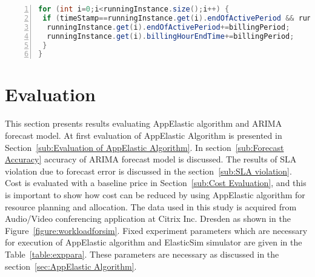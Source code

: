 \begin{lstlisting}[language=java,caption=AppElastic No scale/extend VM,label=list:appelasticnoscale,numbers=left,frame=single,fontadjust=true,breaklines,basicstyle=\small]
for (int i=0;i<runningInstance.size();i++) {
 if (timeStamp==runningInstance.get(i).endOfActivePeriod && runningInstance.get(i).canExtend) {
  runningInstance.get(i).endOfActivePeriod+=billingPeriod;
  runningInstance.get(i).billingHourEndTime+=billingPeriod;
 }
}
\end{lstlisting}

\section{Evaluation}
\label{sec:Evaluation}
This section presents results evaluating AppElastic algorithm and ARIMA forecast model. At first evaluation of AppElastic Algorithm is presented in Section~\ref{sub:Evaluation of AppElastic Algorithm}. In section~\ref{sub:Forecast Accuracy} accuracy of ARIMA forecast model is discussed. The results of SLA violation due to forecast error is discussed in the section~\ref{sub:SLA violation}. Cost is evaluated with a baseline price in Section~\ref{sub:Cost Evaluation}, and this is important to show how cost can be reduced by using AppElastic algorithm for resource planning and allocation. The data used in this study is acquired from Audio/Video conferencing application at Citrix Inc. Dresden as shown in the Figure~\ref{figure:workloadforsim}. Fixed experiment parameters which are necessary for execution of AppElastic algorithm and ElasticSim simulator are given in the Table~\ref{table:exppara}. These parameters are necessary as discussed in the section~\ref{sec:AppElastic Algorithm}.
\begin{center}
  \begin{table}
    \caption{ Fixed experiment parameters}
     \label{table:exppara}
\end{table}
\end{center}
